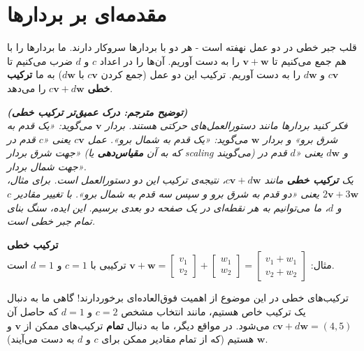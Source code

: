 \documentclass[12pt, a4paper]{book}
\begin{document}
	
	\onehalfspacing
	
	\chapter{مقدمه‌ای بر بردارها}
	
	قلب جبر خطی در دو عمل نهفته است - هر دو با بردارها سروکار دارند. ما بردارها را با هم جمع می‌کنیم تا $\mathbf{v} + \mathbf{w}$ را به دست آوریم. آن‌ها را در اعداد $c$ و $d$ ضرب می‌کنیم تا $c\mathbf{v}$ و $d\mathbf{w}$ را به دست آوریم. ترکیب این دو عمل (جمع کردن $c\mathbf{v}$ با $d\mathbf{w}$) به ما \textbf{ترکیب خطی} $c\mathbf{v} + d\mathbf{w}$ را می‌دهد.
	
	\vspace{5mm}
	\textit{\textbf{(توضیح مترجم: درک عمیق‌تر ترکیب خطی)} \\
		فکر کنید بردارها مانند دستورالعمل‌های حرکتی هستند. بردار $\mathbf{v}$ می‌گوید: «یک قدم به شرق برو» و بردار $\mathbf{w}$ می‌گوید: «یک قدم به شمال برو». عمل $c\mathbf{v}$ یعنی «$c$ قدم در جهت شرق بردار» (که به آن \textbf{مقیاس‌دهی} یا scaling می‌گویند) و $d\mathbf{w}$ یعنی «$d$ قدم در جهت شمال بردار». \\
		یک \textbf{ترکیب خطی} مانند $c\mathbf{v} + d\mathbf{w}$، نتیجه‌ی ترکیب این دو دستورالعمل است. برای مثال، $2\mathbf{v} + 3\mathbf{w}$ یعنی «دو قدم به شرق برو و سپس سه قدم به شمال برو». با تغییر مقادیر $c$ و $d$، ما می‌توانیم به هر نقطه‌ای در یک صفحه دو بعدی برسیم. این ایده، سنگ بنای تمام جبر خطی است.}
	\vspace{5mm}
	
	\textbf{ترکیب خطی}\\
	مثال: $\mathbf{v} + \mathbf{w} = \begin{bmatrix} v_1 \\ v_2 \end{bmatrix} + \begin{bmatrix} w_1 \\ w_2 \end{bmatrix} = \begin{bmatrix} v_1 + w_1 \\ v_2 + w_2 \end{bmatrix}$ ترکیبی با $c=1$ و $d=1$ است.
	
	ترکیب‌های خطی در این موضوع از اهمیت فوق‌العاده‌ای برخوردارند! گاهی ما به دنبال یک ترکیب خاص هستیم، مانند انتخاب مشخص $c = 2$ و $d = 1$ که حاصل آن $c\mathbf{v} + d\mathbf{w} = (4, 5)$ می‌شود. در مواقع دیگر، ما به دنبال \textbf{تمام} ترکیب‌های ممکن از $\mathbf{v}$ و $\mathbf{w}$ هستیم (که از تمام مقادیر ممکن برای $c$ و $d$ به دست می‌آیند).
	
\end{document}
